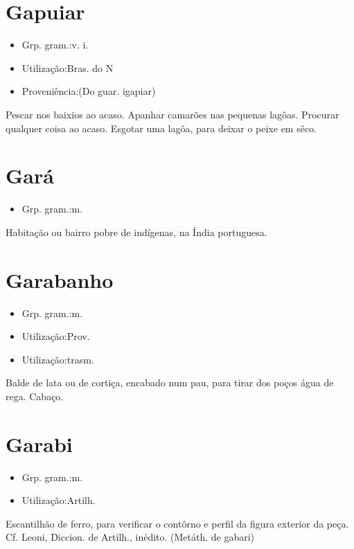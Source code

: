 \section{Gapuiar}
\begin{itemize}
\item {Grp. gram.:v. i.}
\end{itemize}
\begin{itemize}
\item {Utilização:Bras. do N}
\end{itemize}
\begin{itemize}
\item {Proveniência:(Do guar. \textunderscore igapiar\textunderscore )}
\end{itemize}
Pescar nos baixios ao acaso.
Apanhar camarões nas pequenas lagôas.
Procurar qualquer coisa ao acaso.
Esgotar uma lagôa, para deixar o peixe em sêco.
\section{Gará}
\begin{itemize}
\item {Grp. gram.:m.}
\end{itemize}
Habitação ou bairro pobre de indígenas, na Índia portuguesa.
\section{Garabanho}
\begin{itemize}
\item {Grp. gram.:m.}
\end{itemize}
\begin{itemize}
\item {Utilização:Prov.}
\end{itemize}
\begin{itemize}
\item {Utilização:trasm.}
\end{itemize}
Balde de lata ou de cortiça, encabado num pau, para tirar dos poços água de rega.
Cabaço.
\section{Garabi}
\begin{itemize}
\item {Grp. gram.:m.}
\end{itemize}
\begin{itemize}
\item {Utilização:Artilh.}
\end{itemize}
Escantilhão de ferro, para verificar o contôrno e perfil da figura exterior da peça. Cf. Leoni, \textunderscore Diccion. de Artilh.\textunderscore , inédito.
(Metáth. de \textunderscore gabari\textunderscore )
